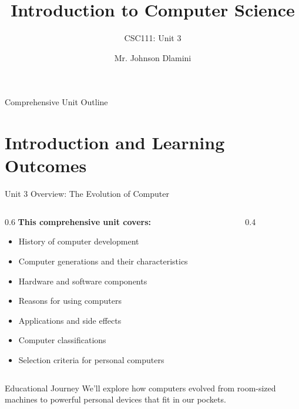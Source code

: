 \documentclass[aspectratio=169]{beamer}
\title[University of Eswatini]{Introduction to Computer Science
}
\subtitle{CSC111: Unit 3}
\author[J.S.D]{Mr. Johnson Dlamini}
\institute[jsdlamini@uniswa.sz]{ The University of Eswatini}
\date
\begin{document}
\frame{\titlepage}



 

\frame{\titlepage}

\begin{frame}[fragile]{Comprehensive Unit Outline}
    \tableofcontents
\end{frame}

\section{Introduction and Learning Outcomes}

\begin{frame}{Unit 3 Overview: The Evolution of Computer}
    \begin{columns}
        \begin{column}{0.6\textwidth}
            \textbf{This comprehensive unit covers:}
            \begin{itemize}
                \item History of computer development
                \item Computer generations and their characteristics
                \item Hardware and software components
                \item Reasons for using computers
                \item Applications and side effects
                \item Computer classifications
                \item Selection criteria for personal computers
            \end{itemize}
        \end{column}
        \begin{column}{0.4\textwidth}
            \centering
        \end{column}
    \end{columns}
    
    \vspace{0.5cm}
    \begin{alertblock}{Educational Journey}
        We'll explore how computers evolved from room-sized machines to powerful personal devices that fit in our pockets.
    \end{alertblock}
\end{frame}
\end{document}
